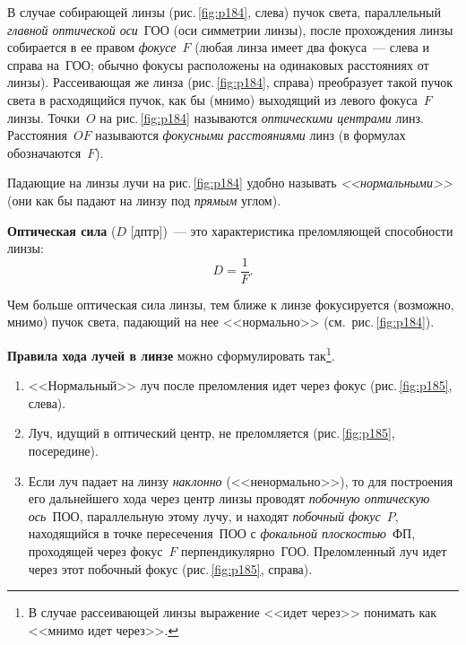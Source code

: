 \documentclass[main.tex]{subfiles}
\begin{document}
В случае собирающей линзы (рис.\,\ref{fig:p184}, слева) пучок света, параллельный \emph{главной оптической оси}~ГОО (оси симметрии линзы), после прохождения линзы собирается в ее правом \emph{фокусе}~$F$ (любая линза имеет два фокуса~--- слева и справа на~ГОО; обычно фокусы расположены на одинаковых расстояниях от линзы). Рассеивающая же линза (рис.\,\ref{fig:p184}, справа) преобразует такой пучок света в расходящийся пучок, как бы (мнимо) выходящий из левого фокуса~$F$ линзы. Точки~$O$ на рис.\,\ref{fig:p184} называются \emph{оптическими центрами} линз. Расстояния~$OF$ называются \emph{фокусными расстояниями} линз (в формулах обозначаются~$F$).

Падающие на линзы лучи на рис.\,\ref{fig:p184} удобно называть \emph{<<нормальными>>} (они как бы падают на линзу под \emph{прямым} углом).

\textbf{Оптическая сила} ($D$ [дптр])~--- это характеристика преломляющей способности линзы:
\begin{equation}
    D=\frac{1}{F}.
\end{equation}

Чем больше оптическая сила линзы, тем ближе к линзе фокусируется (возможно, мнимо) пучок света, падающий на нее <<нормально>> (см.~рис.\,\ref{fig:p184}).

\textbf{Правила хода лучей в линзе} можно сформулировать так\footnote{В случае рассеивающей линзы выражение <<идет через>> понимать как <<мнимо идет через>>.}. 
\begin{enumerate}
    \item <<Нормальный>> луч после преломления идет через фокус (рис.\,\ref{fig:p185}, слева).
    \item Луч, идущий в оптический центр, не преломляется (рис.\,\ref{fig:p185}, посередине).
    \item Если луч падает на линзу \emph{наклонно} (<<ненормально>>), то для построения его дальнейшего хода через центр линзы проводят \emph{побочную оптическую ось}~ПОО, параллельную этому лучу, и находят \emph{побочный фокус~$P$}, находящийся в точке пересечения~ПОО с \emph{фокальной плоскостью}~ФП, проходящей через фокус~$F$ перпендикулярно~ГОО. Преломленный луч идет через этот побочный фокус (рис.\,\ref{fig:p185}, справа). 
\end{enumerate}
\nointerlineskip
\end{document}
